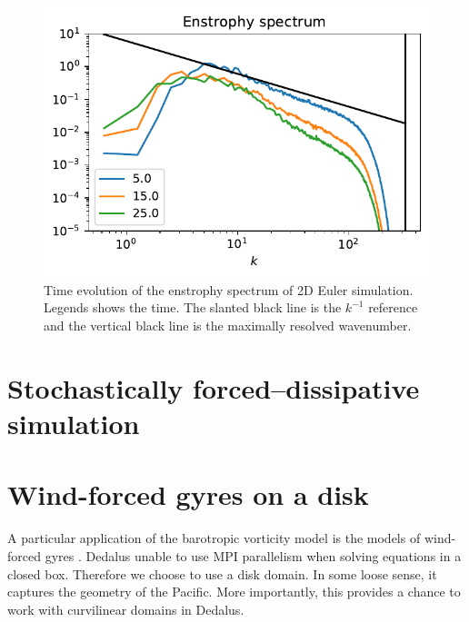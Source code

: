 \begin{figure}
    \centering
    \includegraphics{2DEuler_spec}
    \caption{Time evolution of the enstrophy spectrum of 2D Euler simulation. Legends shows the time. The slanted black line is the $k^{-1}$ reference and the vertical black line is the maximally resolved wavenumber.}
    \label{fig:2DEuler_spec}
\end{figure}


\section{Stochastically forced--dissipative simulation}


\section{Wind-forced gyres on a disk}\label{sec:wind_gyres_disk}
A particular application of the barotropic vorticity model is the models of wind-forced gyres \cite[\S 19.1.2.I]{Vallis_17}. Dedalus unable to use MPI parallelism when solving equations in a closed box. Therefore we choose to use a disk domain. In some loose sense, it captures the geometry of the Pacific. More importantly, this provides a chance to work with curvilinear domains in Dedalus.

